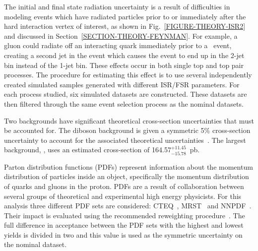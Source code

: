 {}

The initial and final state radiation uncertainty is a result of difficulties in modeling events which have radiated particles prior to or immediately after the hard interaction vertex of interest, as shown in Fig.~\ref{FIGURE-THEORY-ISR2} and discussed in Section~\ref{SECTION-THEORY-FEYNMAN}. For example, a gluon could radiate off an interacting quark immediately prior to a \Wtchan\ event, creating a second jet in the event which causes the event to end up in the 2-jet bin instead of the 1-jet bin. These effects occur in both single top and top pair processes. The procedure for estimating this effect is to use several independently created simulated samples generated with different ISR/FSR parameters. For each process studied, six simulated datasets are constructed. These datasets are then filtered through the same event selection process as the nominal datasets.\\


{}

Two backgrounds have significant theoretical cross-section uncertainties that must be accounted for. The diboson background is given a symmetric 5\% cross-section uncertainty to account for the associated theoretical uncertainties~\cite{Campbell1999}. The largest background, \ttbar, uses an estimated cross-section of 164.57$^{+11.45}_{-15.78}$~pb.~\cite{ATLAS-TTBAR-2010}\\

{}

Parton distribution functions (PDFs) represent information about the momentum distribution of particles inside an object, specifically the momentum distribution of quarks and gluons in the proton. PDFs are a result of collaboration between several groups of theoretical and experimental high energy physicists. For this analysis three different PDF sets are considered: CTEQ~\cite{cteq6l}, MRST~\cite{springerlink:10} and NNPDF~\cite{PhysRevD.82.014002}. Their impact is evaluated using the recommended reweighting procedure~\cite{ATLAS-TDR}. The full difference in acceptance between the PDF sets with the highest and lowest yields is divided in two and this value is used as the symmetric uncertainty on the nominal dataset.\\

